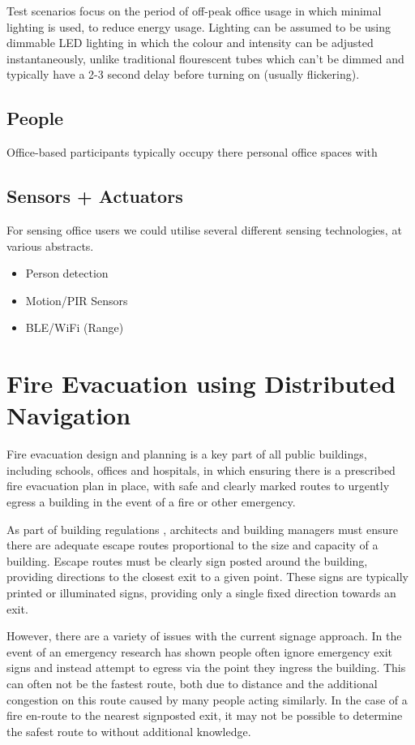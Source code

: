 Test scenarios focus on the period of off-peak office usage in which minimal lighting is used, to reduce energy usage. Lighting can be assumed to be using dimmable LED lighting in which the colour and intensity can be adjusted instantaneously, unlike traditional flourescent tubes which can't be dimmed and typically have a 2-3 second delay before turning on (usually flickering). 

\subsection{People}
\label{subsec:People}
Office-based participants typically occupy there personal office spaces with
\subsection{Sensors + Actuators}
\label{subsec:Sensors + Actuators}
For sensing office users we could utilise several different sensing technologies, at various abstracts.
\begin{itemize}
  \item Person detection
  \item Motion/PIR Sensors
  \item BLE/WiFi (Range)
\end{itemize}
\section{Fire Evacuation using Distributed Navigation}
Fire evacuation design and planning is a key part of all public buildings, including schools, offices and hospitals, in which ensuring there is a prescribed fire evacuation plan in place, with safe and clearly marked routes to urgently egress a building in the event of a fire or other emergency. 

As part of building regulations \cite{fireLegislation}, architects and building managers must ensure there are adequate escape routes proportional to the size and capacity of a building. Escape routes must be clearly sign posted around the building, providing directions to the closest exit to a given point. These signs are typically printed or illuminated signs, providing only a single fixed direction towards an exit.

However, there are a variety of issues with the current signage approach. In the event of an emergency research has shown people often ignore emergency exit signs and instead attempt to egress via the point they ingress the building. This can often not be the fastest route, both due to distance and the additional congestion on this route caused by many people acting similarly. In the case of a fire en-route to the nearest signposted exit, it may not be possible to determine the safest route to without additional knowledge.


